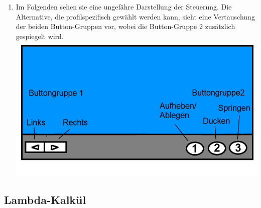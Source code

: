 \documentclass{scrartcl}
\begin{document}
\begin{enumerate}
	\item Im Folgenden sehen sie eine ungefähre Darstellung der Steuerung. Die Alternative, die profilspezifisch gewählt werden kann, sieht eine Vertauschung der beiden Button-Gruppen vor, wobei die Button-Gruppe 2 zusätzlich gespiegelt wird.\\
	\includegraphics[scale=0.5]{assets/Steuerung}
\end{enumerate}


\subsection{Lambda-Kalkül}  \label{subsection:LambdaKalkül}
\end{document}
